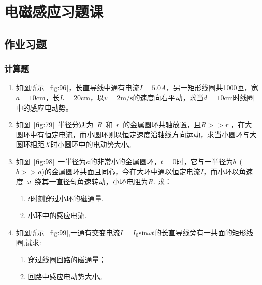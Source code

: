 \chapter{电磁感应习题课}
\section{作业习题}
\subsection*{计算题}
\begin{enumerate}
    \item 如图所示~\ref{fig:96}，长直导线中通有电流$I=5.0A$，另一矩形线圈共1000匝，宽$a=10\mathrm{cm}$，长$L=20\mathrm{cm}$，以$v=2\mathrm{m/s}$的速度向右平动，求当$d=10\mathrm{cm}$时线圈中的感应电动势。
    \item 如图~\ref{fig:79}~半径分别为~$R$~和~$r$~的金属圆环共轴放置，且$R>>r$ ，在大圆环中有恒定电流，而小圆环则以恒定速度沿轴线方向运动，求当小圆环与大圆环相距$X$时小圆环中的电动势大小。
    \item 如图~\ref{fig:98}~一半径为$a$的非常小的金属圆环，$t=0$时，它与一半径为$b$~($b>>a$)的金属圆环共面且同心，今在大环中通以恒定电流$I$，而小环以角速度~$\omega$~绕其一直径匀角速转动，小环电阻为$R$. 求：
    \begin{enumerate}[label=(\arabic*)]
        \item  $t$时刻穿过小环的磁通量.
        \item 小环中的感应电流.
    \end{enumerate}
    \item 如图所示~\ref{fig:99},一通有交变电流$I=I_0\mathrm{sin}\omega t$的长直导线旁有一共面的矩形线圈,试求:
    \begin{enumerate}[label=(\arabic*)]
        \item 穿过线圈回路的磁通量；
        \item 回路中感应电动势大小。
    \end{enumerate}
\end{enumerate}